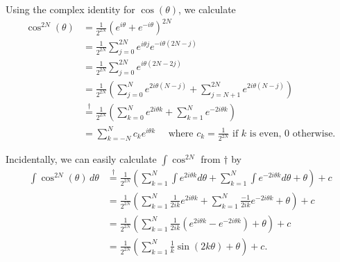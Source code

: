 \documentclass{homework}
\begin{document}
\begin{solution}
Using the complex identity for $\cos(\theta)$, we calculate
\begin{align*}
  \cos^{2N}(\theta) 
  &= \frac{1}{2^{2N}} (e^{i\theta} + e^{-i\theta})^{2N}\\
  &= \frac{1}{2^{2N}} \sum_{j=0}^{2N} e^{i\theta j}e^{-i\theta(2N-j)} \\
  &= \frac{1}{2^{2N}} \sum_{j=0}^{2N} e^{i\theta(2N-2j)} \\
  &= \frac{1}{2^{2N}} \left(\sum_{j=0}^{N} e^{2i\theta(N-j)} + \sum_{j=N+1}^{2N} e^{2i\theta(N-j)}\right)\\
  &\stackrel\dagger= \frac{1}{2^{2N}} \left(\sum_{k=0}^{N} e^{2i\theta k} + \sum_{k=1}^{N} e^{-2i\theta k}\right)\\
  &= \sum_{k=-N}^N c_k e^{i\theta k} \quad \text{ where } c_k = \frac 1{2^{2N}}\text{ if $k$ is even, $0$ otherwise.}
\end{align*}

Incidentally, we can easily calculate $\int \cos^{2N}$ from $\dagger$ by
\begin{align*}
\int \cos^{2N}(\theta)\, d\theta 
  &\stackrel\dagger= \frac{1}{2^{2N}} \left(\sum_{k=1}^{N} \int e^{2i\theta k} d\theta + \sum_{k=1}^{N} \int e^{-2i\theta k} d\theta + \theta\right) + c\\
  &= \frac{1}{2^{2N}} \left(\sum_{k=1}^{N} \frac 1{2ik} e^{2i\theta k} + \sum_{k=1}^{N} \frac {-1}{2ik} e^{-2i\theta k}  + \theta\right) + c\\
  &= \frac{1}{2^{2N}} \left(\sum_{k=1}^{N} \frac 1{2ik} \left(e^{2i\theta k} - e^{-2i\theta k}\right)  + \theta\right) + c\\
  &= \frac{1}{2^{2N}} \left(\sum_{k=1}^{N} \frac 1{k} \sin(2k\theta)  + \theta\right) + c.\\
\end{align*}
\end{solution}
\end{document}
